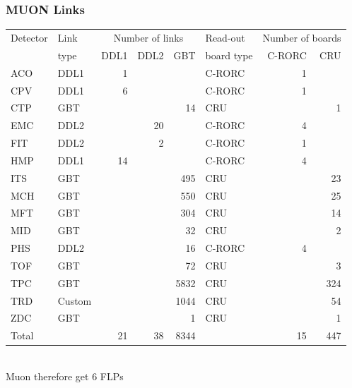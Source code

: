 \documentclass{beamer}
\begin{document}
\begin{frame}
  \frametitle{MUON Links}
  \tiny{\begin{tabular}{|l|l|r|r|r|l|r|r|}
   Detector  &      Link    &  \multicolumn{3}{c}{ Number of links}   &     Read-out &   \multicolumn{2}{c}{Number of boards} \\
             &      type    & DDL1& DDL2 &  GBT  &  board type&   C-RORC& CRU \\ \hline\hline
    ACO      &     DDL1     &  1  &      &       &  C-RORC    &      1   &   \\ 
    CPV      &     DDL1     &  6  &      &       &  C-RORC    &      1   &\\ 
    CTP      &    GBT       &     &      &    14 &  CRU       &          &     1\\ 
    EMC      &   DDL2       &     &   20 &       &  C-RORC    &      4   &\\ 
    FIT      &     DDL2     &     &    2 &       &  C-RORC    &      1   &\\ 
    HMP      &     DDL1     &  14 &      &       &  C-RORC    &      4   &\\ 
    ITS      &     GBT      &     &      &   495 &  CRU       &          &               23\\ 
\rowcolor{MRed}    MCH      &     GBT      &     &      &   550 &  CRU       &          &               25\\ 
\rowcolor{MRed}    MFT      &     GBT      &     &      &   304 &  CRU       &          &               14\\ 
\rowcolor{MRed}    MID      &     GBT      &     &      &    32 &  CRU       &          &                2\\ 
    PHS      &     DDL2     &     &      &    16 &  C-RORC    &     4    &\\ 
    TOF      &     GBT      &     &      &    72 &  CRU       &          &               3\\ 
    TPC      &     GBT      &     &      &  5832 &  CRU       &          &             324\\ 
    TRD      &     Custom   &     &      &  1044 &  CRU       &          &              54\\ 
    ZDC      &     GBT      &     &      &     1 &  CRU       &          &               1\\  \hline
    Total    &               & 21 &  38  &  8344 &            &   15     &          447\\ 
            \end{tabular}}\\
            \vspace{1cm}
            Muon therefore get 6 FLPs
\end{frame}
\end{document}
